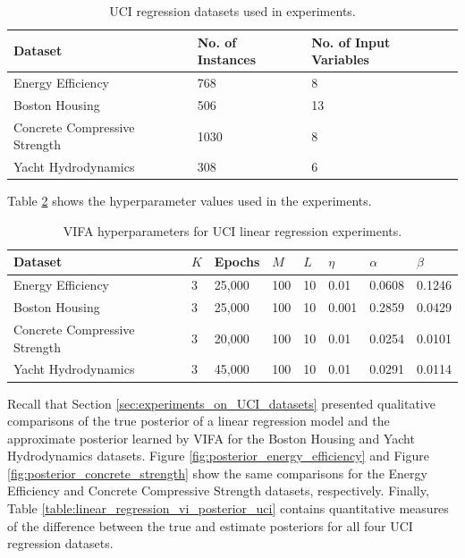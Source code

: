 \documentclass[10pt]{article} %
\begin{document}
\begin{table}[h!]
\caption{UCI regression datasets used in experiments.}
\begin{center}
\begin{tabular}{l|ll}
\label{table:uci_datasets}
\textbf{Dataset}              & \textbf{No. of Instances} & \textbf{No. of Input Variables} \\ \hline
Energy Efficiency             & 768                       & 8                               \\
Boston Housing                & 506                       & 13                              \\
Concrete Compressive Strength & 1030                      & 8                               \\
Yacht Hydrodynamics           & 308                       & 6                    
\end{tabular}
\end{center}
\end{table}

Table \ref{table:vifa_uci_hyperparameters} shows the hyperparameter values used in the experiments.
\begin{table}[h!]
\caption{VIFA hyperparameters for UCI linear regression experiments.}
\begin{center}
\label{table:vifa_uci_hyperparameters}
\begin{tabular}{l|lllllll}
\textbf{Dataset} & \textbf{$K$} & \textbf{Epochs} & \textbf{$M$} & \textbf{$L$} & \textbf{$\eta$} & \textbf{$\alpha$} & \textbf{$\beta$} \\ \hline
Energy Efficiency 				& 3 & 25,000 & 100 & 10 	& 0.01 	& 0.0608 & 0.1246 \\ 
Boston Housing 				& 3 & 25,000 & 100 & 10 	& 0.001 	& 0.2859 & 0.0429 \\
 Concrete Compressive Strength	& 3 & 20,000 & 100 & 10 	& 0.01 	& 0.0254 & 0.0101 \\
 Yacht Hydrodynamics 			& 3 & 45,000 & 100 & 10 	& 0.01 	& 0.0291 & 0.0114 \\
\end{tabular}
\end{center}
\end{table}

Recall that Section \ref{sec:experiments_on_UCI_datasets} presented qualitative comparisons of the true posterior of a linear regression model and the approximate posterior learned by VIFA for the Boston Housing and Yacht Hydrodynamics datasets. Figure \ref{fig:posterior_energy_efficiency} and Figure \ref{fig:posterior_concrete_strength} show the same comparisons for the Energy Efficiency and Concrete Compressive Strength datasets, respectively. Finally, Table \ref{table:linear_regression_vi_posterior_uci} contains quantitative measures of the difference between the true and estimate posteriors for all four UCI regression datasets. 
\end{document}
